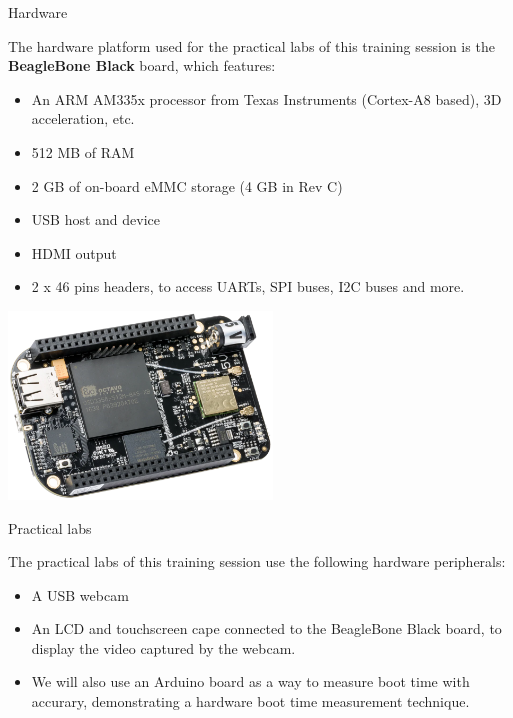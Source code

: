 \documentclass[a4paper,12pt,obeyspaces,spaces,hyphens]{article}
\begin{document}

\feagendatwocolumn
{Hardware}
{
  The hardware platform used for the practical labs of this training
  session is the {\bf BeagleBone Black} board, which features:

  \begin{itemize}
  \item An ARM AM335x processor from Texas Instruments (Cortex-A8
    based), 3D acceleration, etc.
  \item 512 MB of RAM
  \item 2 GB of on-board eMMC storage
        \newline(4 GB in Rev C)
  \item USB host and device
  \item HDMI output
  \item 2 x 46 pins headers, to access UARTs, SPI buses, I2C buses
    and more.
  \end{itemize}
}
{}
{
  \begin{center}
    \includegraphics[height=5cm]{../slides/beagleboneblack-board/beagleboneblack.png}
  \end{center}
}

\feagendaonecolumn
{Practical labs}
{
  The practical labs of this training session use the following
  hardware peripherals:

  \begin{itemize}
  \item A USB webcam
  \item An LCD and touchscreen cape connected to the
    BeagleBone Black board, to display the video captured by the webcam.
  \item We will also use an Arduino board as a way to measure boot time with accurary,
    demonstrating a hardware boot time measurement technique.
  \end{itemize}
}
\end{document}
